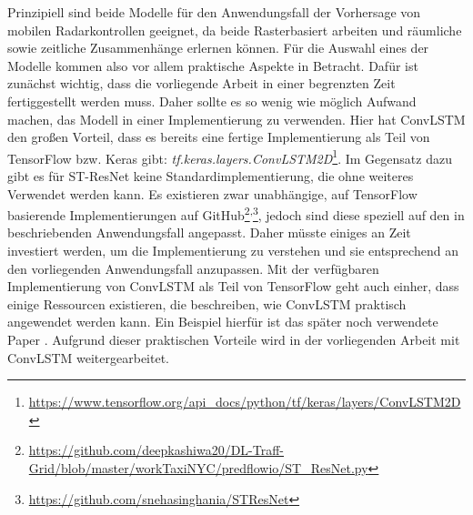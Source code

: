 Prinzipiell sind beide Modelle für den Anwendungsfall der Vorhersage von mobilen Radarkontrollen geeignet, da beide Rasterbasiert arbeiten und räumliche sowie zeitliche Zusammenhänge erlernen können.
Für die Auswahl eines der Modelle kommen also vor allem praktische Aspekte in Betracht.
Dafür ist zunächst wichtig, dass die vorliegende Arbeit in einer begrenzten Zeit fertiggestellt werden muss.
Daher sollte es so wenig wie möglich Aufwand machen, das Modell in einer Implementierung zu verwenden.
Hier hat ConvLSTM den großen Vorteil, dass es bereits eine fertige Implementierung als Teil von TensorFlow bzw. Keras gibt: \emph{tf.keras.layers.ConvLSTM2D}\footnote{\url{https://www.tensorflow.org/api_docs/python/tf/keras/layers/ConvLSTM2D}}.
Im Gegensatz dazu gibt es für ST-ResNet keine Standardimplementierung, die ohne weiteres Verwendet werden kann.
Es existieren zwar unabhängige, auf TensorFlow basierende Implementierungen auf GitHub\footnote{\url{https://github.com/deepkashiwa20/DL-Traff-Grid/blob/master/workTaxiNYC/predflowio/ST_ResNet.py}}\textsuperscript{,}\footnote{\url{https://github.com/snehasinghania/STResNet}}, jedoch sind diese speziell auf den in \cite{STResNetOriginal} beschriebenden Anwendungsfall angepasst.
Daher müsste einiges an Zeit investiert werden, um die Implementierung zu verstehen und sie entsprechend an den vorliegenden Anwendungsfall anzupassen.
Mit der verfügbaren Implementierung von ConvLSTM als Teil von TensorFlow geht auch einher, dass einige Ressourcen existieren, die beschreiben, wie ConvLSTM praktisch angewendet werden kann.
Ein Beispiel hierfür ist das später noch verwendete Paper \cite{CrimeConvLSTM}.
Aufgrund dieser praktischen Vorteile wird in der vorliegenden Arbeit mit ConvLSTM weitergearbeitet.
